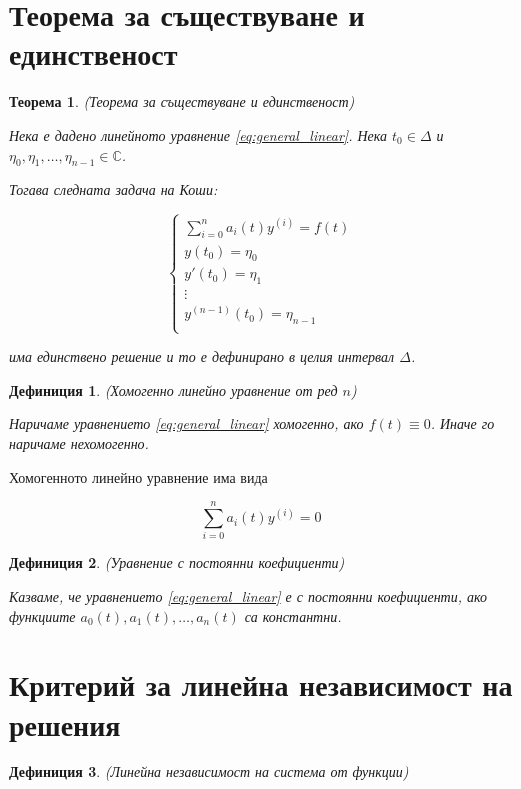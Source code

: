 \documentclass{scrartcl}
\newtheorem{theorem}{Теорема}
\newtheorem{definition}{Дефиниция}
\begin{document}
\begin{FlushLeft}
\section{Теорема за съществуване и единственост}

\begin{theorem}\label{th:unique_sol}
(Теорема за съществуване и единственост)

Нека е дадено линейното уравнение \eqref{eq:general_linear}.
Нека $t_0 \in \Delta$ и $\eta_0, \eta_1, \dots, \eta_{n-1} \in \mathbb{C}$.

Тогава следната задача на Коши:

$$
\begin{cases}
\displaystyle \sum_{i=0}^n a_i(t)y^{(i)} = f(t) \\
y(t_0) = \eta_0 \\
y'(t_0) = \eta_1 \\
\vdots \\
y^{(n-1)}(t_0) = \eta_{n-1} \\
\end{cases}
$$

има единствено решение и то е дефинирано в целия интервал $\Delta$.
\end{theorem}

\begin{definition}
(Хомогенно линейно уравнение от ред $n$)

Наричаме уравнението \eqref{eq:general_linear} хомогенно, ако $f(t) \equiv 0$. Иначе го наричаме нехомогенно.
\end{definition}

Хомогенното линейно уравнение има вида

\begin{equation}\label{eq:homog}
    \sum_{i=0}^n a_i(t)y^{(i)} = 0
\end{equation}

\begin{definition}
(Уравнение с постоянни коефициенти)

Казваме, че уравнението \eqref{eq:general_linear} е с постоянни коефициенти, ако функциите $a_0(t), a_1(t), \dots, a_n(t)$ са константни.
\end{definition}

\section{Критерий за линейна независимост на решения}

\begin{definition}
(Линейна независимост на система от функции)


\end{definition}
\end{FlushLeft}
\end{document}

